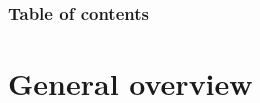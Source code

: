 \documentclass{beamer}
\begin{document}

\begin{frame}\frametitle{Table of contents}\tableofcontents
\end{frame}

\section{General overview} 
\end{document}
